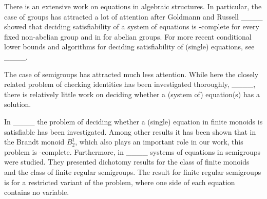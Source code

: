 There is an extensive work on equations in algebraic structures. 
In particular, the case of groups has attracted a lot of attention after Goldmann and Russell ____ showed that deciding satisfiability of a system of equations is \NP-complete for every fixed non-abelian group and in \Ptime for abelian groups. 
For more recent conditional lower bounds and algorithms for deciding satisfiability of (single) equations, see \eg ____.

The case of semigroups has attracted much less attention.
While here the closely related problem of checking identities has been investigated thoroughly, ____, there is relatively little work on deciding whether a (system of) equation(s) has a solution.

In ____ the problem of deciding whether a (single) equation in finite monoids is satisfiable has been investigated.
Among other results it has been shown that in the Brandt monoid $B_2^1$, which also plays an important role in our work, this problem is \NP-complete.
Furthermore, in ____ systems of equations in semigroups were studied.
They presented dichotomy results for the class of finite monoids and the class of finite regular semigroups.
The result for finite regular semigroups is for a restricted variant of the problem, where one side of each equation contains no variable.